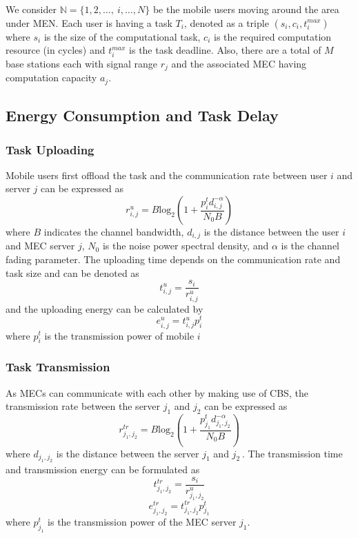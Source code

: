 \documentclass[conference]{IEEEtran}
\begin{document}
  We consider $\mathbb{N}=\{1,2,\dots ,\ i,\dots ,N\}$ be the mobile users moving around the area under MEN. Each user is having a task $T_i$, denoted as a triple $(s_i,c_i,t^{max}_i)$ where $s_i$ is the size of the computational task, $c_i$ is the required computation resource (in cycles) and $t^{max}_i$ is the task deadline.  Also, there are a total of $M$ base stations each with signal range $r_j$ and the associated MEC having computation capacity $a_j$. 



\subsection{Energy Consumption and Task Delay}

\subsubsection{Task Uploading}
Mobile users first offload the task and the communication rate between user $i$ and server $j$ can be expressed as
\begin{equation} \label{c_rate}
r^u_{i,j}=B{{\mathrm{log}}_2 \left(1+\frac{p_i^td^{-\alpha }_{i,j}}{N_0B}\right) } 
\end{equation}
where $B$ indicates the channel bandwidth, $d_{i,j}$ is the distance between the user $i$ and MEC server $j$, $N_0$ is the noise power spectral density, and $\alpha $ is the channel fading parameter. The uploading time depends on the communication rate and task size and can be denoted as
\begin{equation} \label{t_upload}
t^u_{i,j}=\frac{s_i}{r^u_{i,j}} 
\end{equation}
and the uploading energy can be calculated by
\begin{equation} \label{e_upload}
e^u_{i,j}=t^u_{i,j}p^t_i
\end{equation}
where $p^t_i$ is the transmission power of mobile $i$ \\


\subsubsection{Task Transmission}
As MECs can communicate with each other by making use of CBS, the transmission rate between the server $j_1$ and $j_2$ can be expressed as 
\begin{equation} \label{t_rate}
r^{tr}_{j_1,j_2}=B{{\mathrm{log}}_2
\left(1+\frac{p_{j_1}^td^{-\alpha}_{j_1,j_2}}{N_0B}\right)}
\end{equation}
where $d_{j_1,j_2}$ is the distance between the server $j_1$ and ${j_2}_{\ }$. The transmission time and transmission energy can be formulated as
\begin{equation} \label{t_trans}
t^{tr}_{j_1,j_2}=\frac{s_i}{r^u_{j_1,j_2}}
\end{equation}
\begin{equation} \label{e_trans}
e^{tr}_{j_1,j_2}{=t}^{tr}_{j_1,j_2}p^t_{j_1}
\end{equation}
where $p^t_{j_1}$ is the transmission power of the MEC server $j_1$.\\
\end{document}
